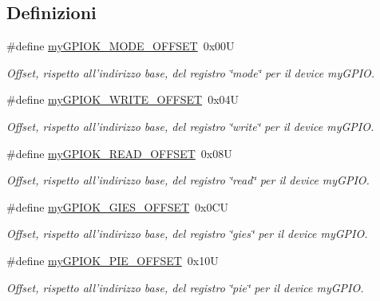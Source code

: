 \subsection*{Definizioni}
\begin{DoxyCompactItemize}
\item 
\#define \hyperlink{group___linux-_driver_ga543e17293942b7cf7936a5e095ddc7ef}{my\+G\+P\+I\+O\+K\+\_\+\+M\+O\+D\+E\+\_\+\+O\+F\+F\+S\+E\+T}~0x00\+U
\begin{DoxyCompactList}\small\item\em Offset, rispetto all'indirizzo base, del registro \char`\"{}mode\char`\"{} per il device my\+G\+P\+I\+O. \end{DoxyCompactList}\item 
\#define \hyperlink{group___linux-_driver_gac165a5d828f3df41e78bb02d4ef38327}{my\+G\+P\+I\+O\+K\+\_\+\+W\+R\+I\+T\+E\+\_\+\+O\+F\+F\+S\+E\+T}~0x04\+U
\begin{DoxyCompactList}\small\item\em Offset, rispetto all'indirizzo base, del registro \char`\"{}write\char`\"{} per il device my\+G\+P\+I\+O. \end{DoxyCompactList}\item 
\#define \hyperlink{group___linux-_driver_gabdb25f3ecdfbf053f4ca207930a56599}{my\+G\+P\+I\+O\+K\+\_\+\+R\+E\+A\+D\+\_\+\+O\+F\+F\+S\+E\+T}~0x08\+U
\begin{DoxyCompactList}\small\item\em Offset, rispetto all'indirizzo base, del registro \char`\"{}read\char`\"{} per il device my\+G\+P\+I\+O. \end{DoxyCompactList}\item 
\#define \hyperlink{group___linux-_driver_ga0da2526ca3cd1a94ebcecf96778ea2e5}{my\+G\+P\+I\+O\+K\+\_\+\+G\+I\+E\+S\+\_\+\+O\+F\+F\+S\+E\+T}~0x0\+C\+U
\begin{DoxyCompactList}\small\item\em Offset, rispetto all'indirizzo base, del registro \char`\"{}gies\char`\"{} per il device my\+G\+P\+I\+O. \end{DoxyCompactList}\item 
\#define \hyperlink{group___linux-_driver_ga2ed7646e6f910f5803477e51b7fe26e3}{my\+G\+P\+I\+O\+K\+\_\+\+P\+I\+E\+\_\+\+O\+F\+F\+S\+E\+T}~0x10\+U
\begin{DoxyCompactList}\small\item\em Offset, rispetto all'indirizzo base, del registro \char`\"{}pie\char`\"{} per il device my\+G\+P\+I\+O. \end{DoxyCompactList}\item 

\end{DoxyCompactItemize}
